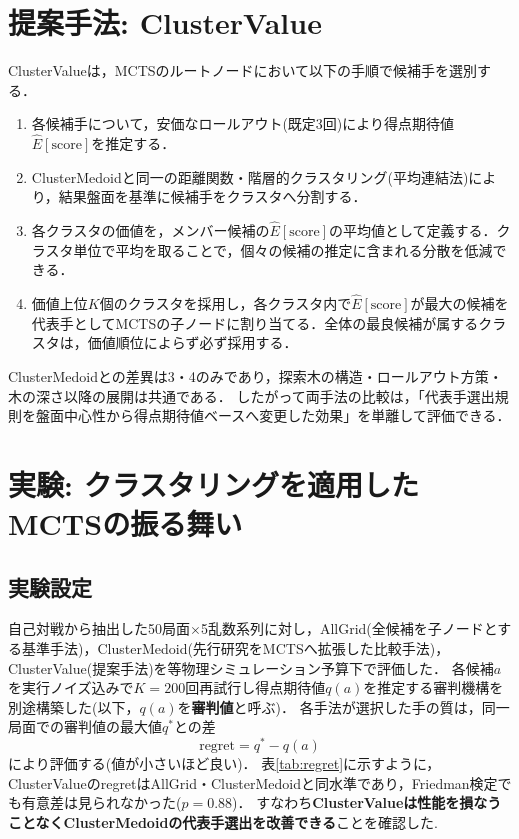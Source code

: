 \documentclass[submit,techrep,noauthor]{ipsj}
\begin{document}
\section{提案手法: ClusterValue}

ClusterValueは，MCTSのルートノードにおいて以下の手順で候補手を選別する．
\begin{enumerate}
\setlength{\itemsep}{1pt}
\item 各候補手について，安価なロールアウト(既定3回)により得点期待値$\hat{E}[\mathrm{score}]$を推定する．
\item ClusterMedoidと同一の距離関数・階層的クラスタリング(平均連結法)により，結果盤面を基準に候補手をクラスタへ分割する．
\item 各クラスタの価値を，メンバー候補の$\hat{E}[\mathrm{score}]$の平均値として定義する．クラスタ単位で平均を取ることで，個々の候補の推定に含まれる分散を低減できる．
\item 価値上位$K$個のクラスタを採用し，各クラスタ内で$\hat{E}[\mathrm{score}]$が最大の候補を代表手としてMCTSの子ノードに割り当てる．全体の最良候補が属するクラスタは，価値順位によらず必ず採用する．
\end{enumerate}

ClusterMedoidとの差異は3・4のみであり，探索木の構造・ロールアウト方策・木の深さ以降の展開は共通である．
したがって両手法の比較は，「代表手選出規則を盤面中心性から得点期待値ベースへ変更した効果」を単離して評価できる．


\section{実験: クラスタリングを適用したMCTSの振る舞い}

\subsection{実験設定}
自己対戦から抽出した50局面$\times$5乱数系列に対し，AllGrid(全候補を子ノードとする基準手法)，ClusterMedoid(先行研究\cite{naka_gi58}をMCTSへ拡張した比較手法)，ClusterValue(提案手法)を等物理シミュレーション予算下で評価した．
各候補$a$を実行ノイズ込みで$K{=}200$回再試行し得点期待値$q(a)$を推定する審判機構を別途構築した(以下，$q(a)$を\textbf{審判値}と呼ぶ)．
各手法が選択した手の質は，同一局面での審判値の最大値$q^{*}$との差
\begin{equation}
\mathrm{regret} = q^{*} - q(a)
\label{eq:regret}
\end{equation}
により評価する(値が小さいほど良い)．
表\ref{tab:regret}に示すように，ClusterValueのregretはAllGrid・ClusterMedoidと同水準であり，Friedman検定でも有意差は見られなかった($p=0.88$)．
すなわち\textbf{ClusterValueは性能を損なうことなくClusterMedoidの代表手選出を改善できる}ことを確認した.
\end{document}
